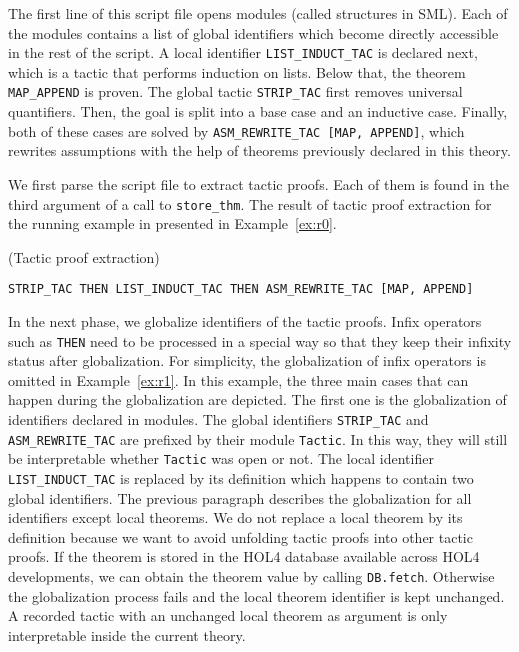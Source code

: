 \documentclass[runningheads,a4paper,draft]{svjour3}
\def\holfour{\textsf{HOL4}\xspace}
\def\sml{\textsf{SML}\xspace}
\begin{document}
The first line of this script file opens modules (called structures in \sml). Each of
the modules contains a list of global identifiers which become directly accessible in
the rest of the script.
A local identifier \texttt{LIST\_INDUCT\_TAC} is declared next, which is a
tactic that performs induction on lists. Below that, the theorem
\texttt{MAP\_APPEND} is proven.
The global tactic \texttt{STRIP\_TAC} first removes universal quantifiers. Then,
the goal is split into a base case and an inductive case. Finally, both
of these cases are solved by \texttt{ASM\_REWRITE\_TAC [MAP, APPEND]}, which
rewrites assumptions with the help of theorems previously declared in this
theory.

We first parse the script file to extract tactic proofs. Each of them is found in
the third argument of a call to \texttt{store\_thm}. The result of tactic proof
extraction for the running example in presented in Example~\ref{ex:r0}.

\begin{example}\label{ex:r0}(Tactic proof extraction)
\small
\begin{lstlisting}[language=SMLSmall]
STRIP_TAC THEN LIST_INDUCT_TAC THEN ASM_REWRITE_TAC [MAP, APPEND]
\end{lstlisting}
\end{example}

In the next phase, we globalize identifiers of the tactic proofs.
Infix operators such as \texttt{THEN} need to be processed in a special way so
that they keep their infixity status after globalization. For simplicity,
the
globalization of infix operators is omitted in Example~\ref{ex:r1}.
In this example, the three main cases that can happen during the globalization
are depicted. The first one is the globalization of identifiers declared in
modules. The global identifiers \texttt{STRIP\_TAC} and
\texttt{ASM\_REWRITE\_TAC} are prefixed by their module \texttt{Tactic}. In
this way, they will still be interpretable whether \texttt{Tactic} was open or
not. The local identifier \texttt{LIST\_INDUCT\_TAC} is replaced by its
definition which happens to contain two global identifiers.
The previous paragraph describes the globalization for all identifiers except
local theorems.  We do not replace a local
theorem by its definition because we want to avoid unfolding tactic proofs into
other tactic proofs.
If the theorem is stored in the \holfour database available across \holfour
developments, we can obtain the theorem value by calling \texttt{DB.fetch}.
Otherwise the globalization process fails and the local theorem identifier is
kept unchanged. A recorded tactic with an unchanged local theorem as argument
is only interpretable inside the current theory.
\end{document}
